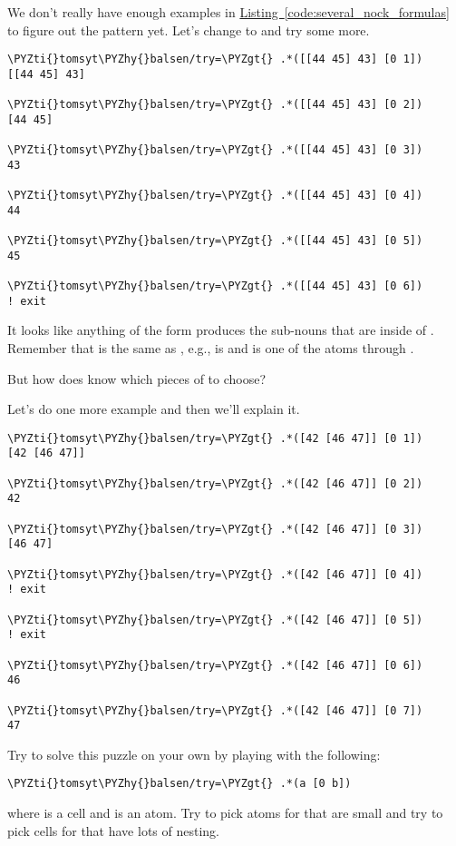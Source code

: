 We don't really have enough examples in \hyperref[code:several_nock_formulas]{Listing~\ref{code:several_nock_formulas}} to figure out the pattern yet. Let's
change \kode{[42 43]} to \kode{[[44 45] 43]} and try some more.
\begin{framed_shaded}
\begin{Verbatim}[fontsize=\relsize{-2.5},commandchars=\\\{\}]
\PYZti{}tomsyt\PYZhy{}balsen/try=\PYZgt{} .*([[44 45] 43] [0 1])
[[44 45] 43]

\PYZti{}tomsyt\PYZhy{}balsen/try=\PYZgt{} .*([[44 45] 43] [0 2])
[44 45]

\PYZti{}tomsyt\PYZhy{}balsen/try=\PYZgt{} .*([[44 45] 43] [0 3])
43

\PYZti{}tomsyt\PYZhy{}balsen/try=\PYZgt{} .*([[44 45] 43] [0 4])
44

\PYZti{}tomsyt\PYZhy{}balsen/try=\PYZgt{} .*([[44 45] 43] [0 5])
45

\PYZti{}tomsyt\PYZhy{}balsen/try=\PYZgt{} .*([[44 45] 43] [0 6])
! exit
\end{Verbatim}
\end{framed_shaded}

It looks like anything of the form \kode{*[a [0 b]]} produces the sub-nouns that are inside of . Remember that \kode{*[a [0 b]]} is the same as , e.g.,  is \kode{[[44 45] 43]} and  is one of the atoms  through .

But how does  \kode{*[a [0 b]]} know which pieces of  to choose?

Let's do one more example and then we'll explain it.
\begin{framed_shaded}
\begin{Verbatim}[fontsize=\relsize{-2.5},commandchars=\\\{\}]
\PYZti{}tomsyt\PYZhy{}balsen/try=\PYZgt{} .*([42 [46 47]] [0 1])
[42 [46 47]]

\PYZti{}tomsyt\PYZhy{}balsen/try=\PYZgt{} .*([42 [46 47]] [0 2])
42

\PYZti{}tomsyt\PYZhy{}balsen/try=\PYZgt{} .*([42 [46 47]] [0 3])
[46 47]

\PYZti{}tomsyt\PYZhy{}balsen/try=\PYZgt{} .*([42 [46 47]] [0 4])
! exit

\PYZti{}tomsyt\PYZhy{}balsen/try=\PYZgt{} .*([42 [46 47]] [0 5])
! exit

\PYZti{}tomsyt\PYZhy{}balsen/try=\PYZgt{} .*([42 [46 47]] [0 6])
46

\PYZti{}tomsyt\PYZhy{}balsen/try=\PYZgt{} .*([42 [46 47]] [0 7])
47
\end{Verbatim}
\end{framed_shaded}
Try to solve this puzzle on your own by playing with the following:
\begin{framed_shaded}
\begin{Verbatim}[fontsize=\relsize{-2.5},commandchars=\\\{\}]
\PYZti{}tomsyt\PYZhy{}balsen/try=\PYZgt{} .*(a [0 b])
\end{Verbatim}
\end{framed_shaded}
where  is a cell and  is an atom. Try to pick atoms for  that are
small and try to pick cells for  that have lots of nesting.

